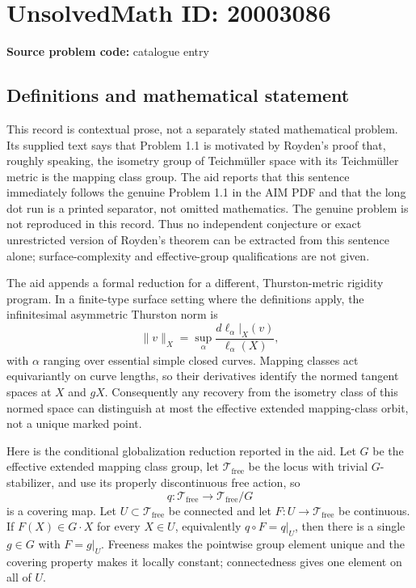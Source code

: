 \documentclass[11pt]{article}
\begin{document}
\section*{UnsolvedMath ID: 20003086}
\textbf{Source problem code:} catalogue entry
\subsection{Definitions and mathematical statement}
This record is contextual prose, not a separately stated mathematical problem. Its supplied text says that Problem 1.1 is motivated by Royden's proof that, roughly speaking, the isometry group of Teichm\"uller space with its Teichm\"uller metric is the mapping class group. The aid reports that this sentence immediately follows the genuine Problem 1.1 in the AIM PDF and that the long dot run is a printed separator, not omitted mathematics. The genuine problem is not reproduced in this record. Thus no independent conjecture or exact unrestricted version of Royden's theorem can be extracted from this sentence alone; surface-complexity and effective-group qualifications are not given.

The aid appends a formal reduction for a different, Thurston-metric rigidity program. In a finite-type surface setting where the definitions apply, the infinitesimal asymmetric Thurston norm is
\[
 \|v\|_X=\sup_{\alpha}
       \frac{d\ell_\alpha|_X(v)}{\ell_\alpha(X)},
\]
with $\alpha$ ranging over essential simple closed curves. Mapping classes act equivariantly on curve lengths, so their derivatives identify the normed tangent spaces at $X$ and $gX$. Consequently any recovery from the isometry class of this normed space can distinguish at most the effective extended mapping-class orbit, not a unique marked point.

Here is the conditional globalization reduction reported in the aid. Let $G$ be the effective extended mapping class group, let $\mathcal T_{\mathrm{free}}$ be the locus with trivial $G$-stabilizer, and use its properly discontinuous free action, so
\[
 q:\mathcal T_{\mathrm{free}}\longrightarrow
       \mathcal T_{\mathrm{free}}/G
\]
is a covering map. Let $U\subset\mathcal T_{\mathrm{free}}$ be connected and let $F:U\to\mathcal T_{\mathrm{free}}$ be continuous. If $F(X)\in G\cdot X$ for every $X\in U$, equivalently $q\circ F=q|_U$, then there is a single $g\in G$ with $F=g|_U$. Freeness makes the pointwise group element unique and the covering property makes it locally constant; connectedness gives one element on all of $U$.
\end{document}
